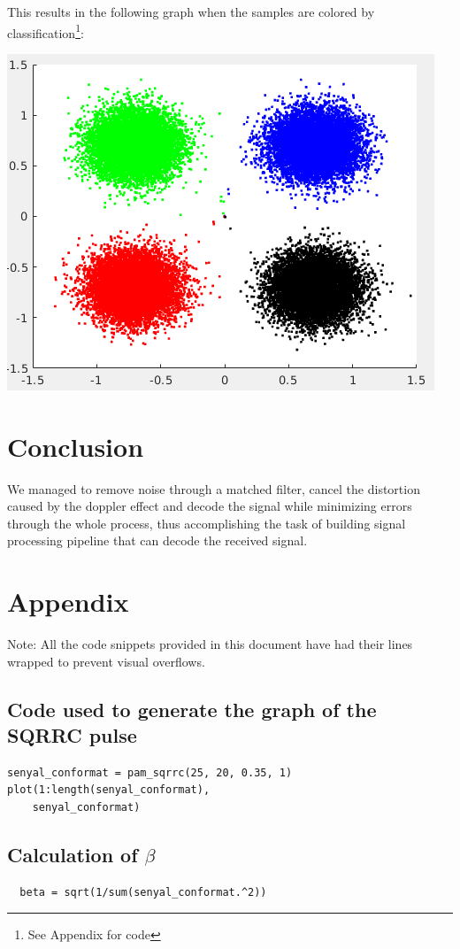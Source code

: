 \documentclass[conference,9pt]{IEEEtran}
\begin{document}
This results in the following graph when the samples are colored by classification\footnote{See Appendix for code}:

\includegraphics[scale=0.5]{class}

\section{Conclusion}
We managed to remove noise through a matched filter, cancel the distortion caused by the doppler effect and decode the signal while minimizing errors through the whole process, thus accomplishing the task of building signal processing pipeline that can decode the received signal.

\section{Appendix}
Note: All the code snippets provided in this document have had their lines wrapped to prevent visual overflows.
\subsection{Code used to generate the graph of the SQRRC pulse}
\begin{verbatim}
senyal_conformat = pam_sqrrc(25, 20, 0.35, 1)
plot(1:length(senyal_conformat),
    senyal_conformat)
\end{verbatim}

\subsection{Calculation of $\beta$}
\begin{verbatim}
  beta = sqrt(1/sum(senyal_conformat.^2))
\end{verbatim}
\end{document}
